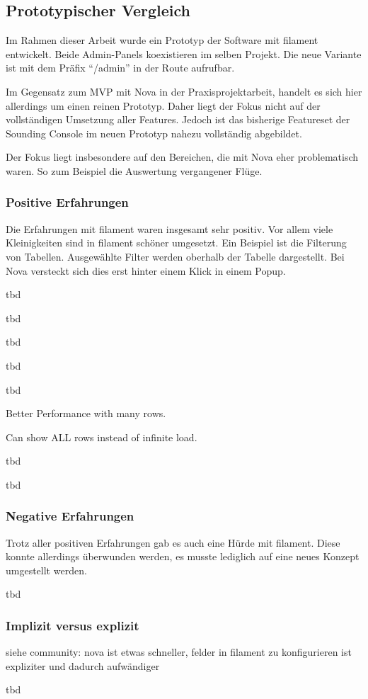 \subsection{Prototypischer Vergleich}
Im Rahmen dieser Arbeit wurde ein Prototyp der Software mit filament entwickelt.
Beide Admin-Panels koexistieren im selben Projekt.
Die neue Variante ist mit dem Präfix \enquote{/admin} in der Route aufrufbar.

Im Gegensatz zum MVP mit Nova in der Praxisprojektarbeit, handelt es sich hier allerdings um einen reinen Prototyp.
Daher liegt der Fokus nicht auf der vollständigen Umsetzung aller Features.
Jedoch ist das bisherige Featureset der Sounding Console im neuen Prototyp nahezu vollständig abgebildet.

Der Fokus liegt insbesondere auf den Bereichen, die mit Nova eher problematisch waren.
So zum Beispiel die Auswertung vergangener Flüge.

\subsubsection{Positive Erfahrungen}
Die Erfahrungen mit filament waren insgesamt sehr positiv.
Vor allem viele Kleinigkeiten sind in filament schöner umgesetzt.
Ein Beispiel ist die Filterung von Tabellen.
Ausgewählte Filter werden oberhalb der Tabelle dargestellt.
Bei Nova versteckt sich dies erst hinter einem Klick in einem Popup.

tbd

tbd

tbd

tbd

tbd

Better Performance with many rows.

Can show ALL rows instead of infinite load.

tbd

tbd

\subsubsection{Negative Erfahrungen}
Trotz aller positiven Erfahrungen gab es auch eine Hürde mit filament.
Diese konnte allerdings überwunden werden, es musste lediglich auf eine neues Konzept umgestellt werden.

tbd

\subsubsection{Implizit versus explizit}
siehe community: nova ist etwas schneller, felder in filament zu konfigurieren ist expliziter und dadurch aufwändiger

tbd
